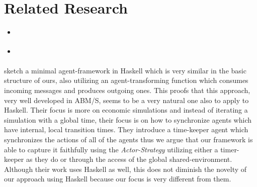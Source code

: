 \section{Related Research}
\begin{itemize}
	\item \cite{huberman_evolutionary_1993}
	\item \cite{a_framework_2008}
\end{itemize} 

\cite{botta_time_2010} sketch a minimal agent-framework in Haskell which is very similar in the basic structure of ours, also utilizing an agent-transforming function which consumes incoming messages and produces outgoing ones. This proofs that this approach, very well developed in ABM/S, seems to be a very natural one also to apply to Haskell. Their focus is more on economic simulations and instead of iterating a simulation with a global time, their focus is on how to synchronize agents which have internal, local transition times. They introduce a time-keeper agent which synchronizes the actions of all of the agents thus we argue that our framework is able to capture it faithfully using the \textit{Actor-Strategy} utilizing either a timer-keeper as they do or through the access of the global shared-environment. Although their work uses Haskell as well, this does not diminish the novelty of our approach using Haskell because our focus is very different from them.